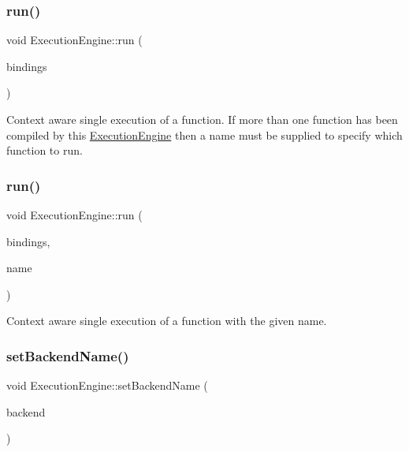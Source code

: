 \subsubsection{\texorpdfstring{run()}{run()}\hspace{0.1cm}{\footnotesize\ttfamily [3/4]}}
{\footnotesize\ttfamily void Execution\+Engine\+::run (\begin{DoxyParamCaption}\item[{\hyperlink{classglow_1_1_placeholder_bindings}{Placeholder\+Bindings} \&}]{bindings }\end{DoxyParamCaption})}

Context aware single execution of a function. If more than one function has been compiled by this \hyperlink{classglow_1_1_execution_engine}{Execution\+Engine} then a name must be supplied to specify which function to run. \mbox{\label{classglow_1_1_execution_engine_aad11bc4c7de37155ee0f29d787d0da31}} 
\subsubsection{\texorpdfstring{run()}{run()}\hspace{0.1cm}{\footnotesize\ttfamily [4/4]}}
{\footnotesize\ttfamily void Execution\+Engine\+::run (\begin{DoxyParamCaption}\item[{\hyperlink{classglow_1_1_placeholder_bindings}{Placeholder\+Bindings} \&}]{bindings,  }\item[{llvm\+::\+String\+Ref}]{name }\end{DoxyParamCaption})}

Context aware single execution of a function with the given {\ttfamily name}. \mbox{\label{classglow_1_1_execution_engine_a35c2e984e60f079f6209de74d903f9a0}} 
\subsubsection{\texorpdfstring{set\+Backend\+Name()}{setBackendName()}}
{\footnotesize\ttfamily void Execution\+Engine\+::set\+Backend\+Name (\begin{DoxyParamCaption}\item[{llvm\+::\+String\+Ref}]{backend }\end{DoxyParamCaption})}



